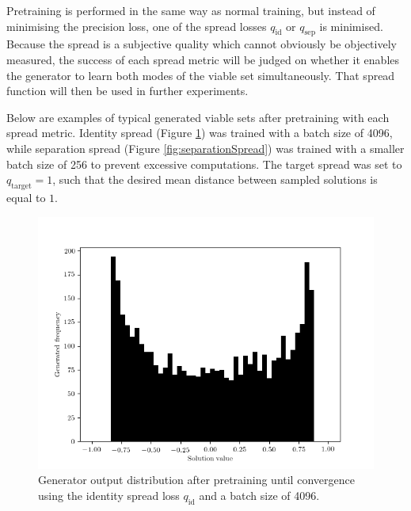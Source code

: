 \documentclass[../../main.tex]{subfiles}
\begin{document}
Pretraining is performed in the same way as normal training, but instead of minimising the precision loss, one of the spread losses $q_\text{id}$ or $q_\text{sep}$ is minimised.
Because the spread is a subjective quality which cannot obviously be objectively measured, the success of each spread metric will be judged on whether it enables the generator to learn both modes of the viable set simultaneously.
That spread function will then be used in further experiments.

Below are examples of typical generated viable sets after pretraining with each spread metric.
Identity spread (Figure \ref{fig:identitySpread}) was trained with a batch size of 4096, while separation spread (Figure \ref{fig:separationSpread}) was trained with a smaller batch size of 256 to prevent excessive computations.
The target spread was set to $q_\text{target}=1$, such that the desired mean distance between sampled solutions is equal to $1$.
\begin{figure}[H]
    \begin{center}
    \includegraphics[width=\textwidth]{identitySpread}
    \caption{
        Generator output distribution after pretraining until convergence using the identity spread loss $q_\text{id}$ and a batch size of 4096.
    }
    \label{fig:identitySpread}
    \end{center}
\end{figure}
\end{document}
